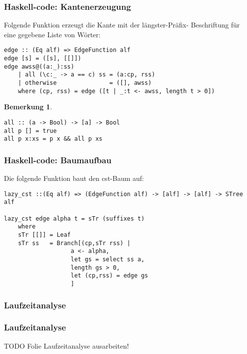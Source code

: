\documentclass{beamer}
\newtheorem{remark}{Bemerkung}
\begin{document}
\begin{frame}[fragile]
\frametitle{Haskell-code: Kantenerzeugung}
Folgende Funktion erzeugt die Kante mit der längster-Präfix- Beschriftung für eine gegebene Liste von Wörter:
\begin{lstlisting}
edge :: (Eq alf) => EdgeFunction alf
edge [s] = ([s], [[]])
edge awss@((a:_):ss)
    | all (\c:_ -> a == c) ss = (a:cp, rss)
    | otherwise               = ([], awss)
    where (cp, rss) = edge ([t | _:t <- awss, length t > 0])
\end{lstlisting}
\bigskip
\begin{remark}
\begin{lstlisting}
all :: (a -> Bool) -> [a] -> Bool
all p [] = true
all p x:xs = p x && all p xs
\end{lstlisting}
\end{remark}
\end{frame}

\begin{frame}[fragile]
\frametitle{Haskell-code: Baumaufbau}
Die folgende Funktion baut den cst-Baum auf:
\begin{lstlisting}
lazy_cst ::(Eq alf) => (EdgeFunction alf) -> [alf] -> [alf] -> STree alf

lazy_cst edge alpha t = sTr (suffixes t)
    where
    sTr [[]] = Leaf
    sTr ss   = Branch[(cp,sTr rss) |
                   a <- alpha,
                   let gs = select ss a,
                   length gs > 0,
                   let (cp,rss) = edge gs
                   ]
\end{lstlisting}
\end{frame}

\subsubsection{Laufzeitanalyse}

\begin{frame}[fragile]
\frametitle{Laufzeitanalyse}
TODO Folie Laufzeitanalyse ausarbeiten!
\end{frame}
\end{document}

